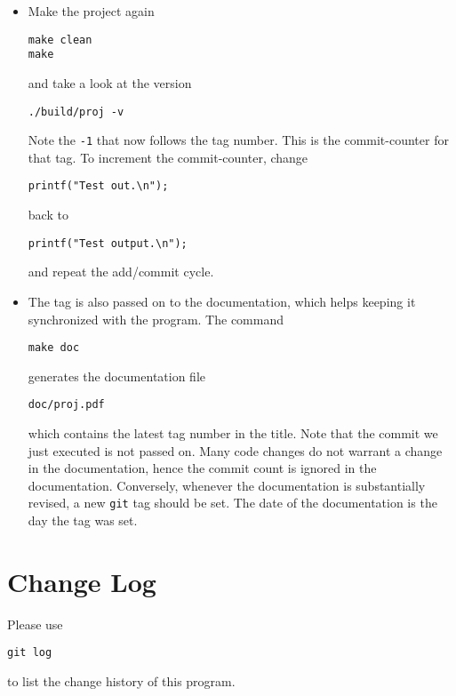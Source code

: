 \documentclass[a4paper, english]{article}
\begin{document}
\begin{itemize}
\begin{verbatim}
printf("Test output.\n");
\end{verbatim}
to, say,
\begin{verbatim}
printf("Test out.\n");
\end{verbatim}
Add the change to the \texttt{git} repository and commit it
\begin{verbatim}
git add src/proj.c 
git commit -m "Test commit"
\end{verbatim}
\item Make the project again
\begin{verbatim}
make clean
make
\end{verbatim}
and take a look at the version
\begin{verbatim}
./build/proj -v
\end{verbatim}
Note the \texttt{-1} that now follows the tag number. This is the
commit-counter for that tag. To increment the commit-counter, change 
\begin{verbatim}
printf("Test out.\n");
\end{verbatim}
back to 
\begin{verbatim}
printf("Test output.\n");
\end{verbatim}
and repeat the add/commit cycle.
\item The tag is also passed on to the documentation, which helps
  keeping it synchronized with the program. The command
\begin{verbatim}
make doc
\end{verbatim}
generates the documentation file
\begin{verbatim}
doc/proj.pdf
\end{verbatim}
which contains the latest tag number in the title. Note that the
commit we just executed is not passed on. Many code changes do not
warrant a change in the documentation, hence the commit count is
ignored in the documentation. Conversely, whenever the documentation
is substantially revised, a new \texttt{git} tag should be set. The
date of the documentation is the day the tag was set.
\end{itemize}

\section{Change Log}
Please use
\begin{verbatim}
git log
\end{verbatim}
to list the change history of this program.


\end{document}
